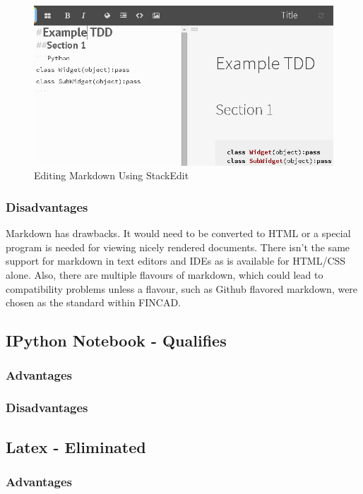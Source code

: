 \documentclass[]{article}
\begin{document}
	\begin{figure}[h]
		\centering
		\includegraphics[scale=.5]{StackEdit.png}
		\caption{Editing Markdown Using StackEdit}
		\label{StackEdit}
	\end{figure}
	
	\subsubsection{Disadvantages}
	Markdown has drawbacks. It would need to be converted to HTML or a special program is needed for viewing nicely rendered documents.  There isn't the same support for markdown in text editors and IDEs as is available for HTML/CSS alone.  Also, there are multiple flavours of markdown, which could lead to compatibility problems unless a flavour, such as Github flavored markdown, were chosen as the standard within FINCAD.


\subsection{IPython Notebook - Qualifies}
	\subsubsection{Advantages}
	\subsubsection{Disadvantages}
	
	
	

\subsection{Latex - Eliminated}
	\subsubsection{Advantages}
	
\end{document}

